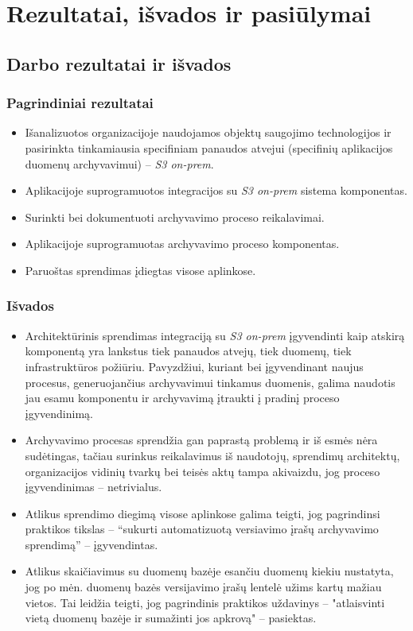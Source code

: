 \section{Rezultatai, išvados ir pasiūlymai}

\subsection{Darbo rezultatai ir išvados}

\subsubsection*{Pagrindiniai rezultatai}

\begin{itemize}
    \item Išanalizuotos organizacijoje naudojamos objektų saugojimo technologijos ir pasirinkta tinkamiausia specifiniam panaudos atvejui (specifinių aplikacijos duomenų archyvavimui) -- \textit{S3 on-prem}.
    \item Aplikacijoje suprogramuotos integracijos su \textit{S3 on-prem} sistema komponentas.
    \item Surinkti bei dokumentuoti archyvavimo proceso reikalavimai.
    \item Aplikacijoje suprogramuotas archyvavimo proceso komponentas.
    \item Paruoštas sprendimas įdiegtas visose aplinkose.
\end{itemize}

\subsubsection*{Išvados}

\begin{itemize}
    \item Architektūrinis sprendimas integraciją su \textit{S3 on-prem} įgyvendinti kaip atskirą komponentą yra lankstus tiek panaudos atvejų, tiek duomenų, tiek infrastruktūros požiūriu. Pavyzdžiui, kuriant bei įgyvendinant naujus procesus, generuojančius archyvavimui tinkamus duomenis, galima naudotis jau esamu komponentu ir archyvavimą įtraukti į pradinį proceso įgyvendinimą.
    \item Archyvavimo procesas sprendžia gan paprastą problemą ir iš esmės nėra sudėtingas, tačiau surinkus reikalavimus iš naudotojų, sprendimų architektų, organizacijos vidinių tvarkų bei teisės aktų tampa akivaizdu, jog proceso įgyvendinimas -- netrivialus.
    \item Atlikus sprendimo diegimą visose aplinkose galima teigti, jog pagrindinsi praktikos tikslas -- \enquote{sukurti automatizuotą versiavimo įrašų archyvavimo sprendimą} -- įgyvendintas.
    \item Atlikus skaičiavimus su duomenų bazėje esančiu duomenų kiekiu nustatyta, jog po  mėn. duomenų bazės versijavimo įrašų lentelė užims  kartų mažiau vietos. Tai leidžia teigti, jog pagrindinis praktikos uždavinys -- "atlaisvinti vietą duomenų bazėje ir sumažinti jos apkrovą" -- pasiektas.
\end{itemize}

